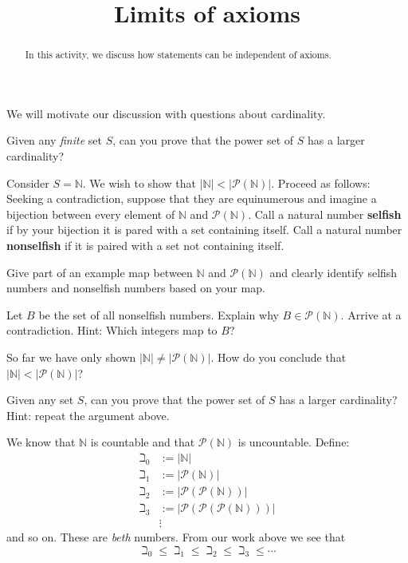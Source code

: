 \documentclass[nooutcomes]{ximera}
\title{Limits of axioms}
\begin{document}
\begin{abstract}
In this activity, we discuss how statements can be independent of axioms.
\end{abstract}
\maketitle 

We will motivate our discussion with questions about cardinality.

\begin{question}
Given any \textit{finite} set $S$, can you prove that the power set of
$S$ has a larger cardinality?
\end{question}

Consider $S=\mathbb{N}$. We wish to show that $|\mathbb{N}|<|\mathcal{P}(\mathbb{N})|$. Proceed as
follows: Seeking a contradiction, suppose that they are equinumerous
and imagine a bijection between every element of $\mathbb{N}$ and
$\mathcal{P}(\mathbb{N})$. Call a natural number \textbf{selfish} if by your bijection
it is pared with a set containing itself. Call a natural number
\textbf{nonselfish} if it is paired with a set not containing itself.

\begin{question}
Give part of an example map between $\mathbb{N}$ and $\mathcal{P}(\mathbb{N})$ and clearly
identify selfish numbers and nonselfish numbers based on your map.
\end{question}

\begin{question}
Let $B$ be the set of all nonselfish numbers. Explain why
$B\in\mathcal{P}(\mathbb{N})$. Arrive at a contradiction. Hint: Which
integers map to $B$?
\end{question}


\begin{question}
So far we have only shown $|\mathbb{N}|\ne |\mathcal{P}(\mathbb{N})|$. How do you conclude that
$|\mathbb{N}|<|\mathcal{P}(\mathbb{N})|$?
\end{question}

\begin{question}
Given any set $S$, can you prove that the power set of $S$ has a
larger cardinality? Hint: repeat the argument above.
\end{question}



We know that $\mathbb{N}$ is countable and that $\mathcal{P}(\mathbb{N})$ is uncountable. Define:
\begin{align*}
\beth_0 &:=|\mathbb{N}|\\
\beth_1 &:=|\mathcal{P}(\mathbb{N})|\\
\beth_2 &:=|\mathcal{P}(\mathcal{P}(\mathbb{N}))|\\
\beth_3 &:=|\mathcal{P}(\mathcal{P}(\mathcal{P}(\mathbb{N})))|\\
        &\vdots
\end{align*}
and so on. These are \textit{beth} numbers. From our work above we see that 
\[
\beth_0 \le \beth_1 \le \beth_2 \le \beth_3 \le \cdots
\]
\end{document}
